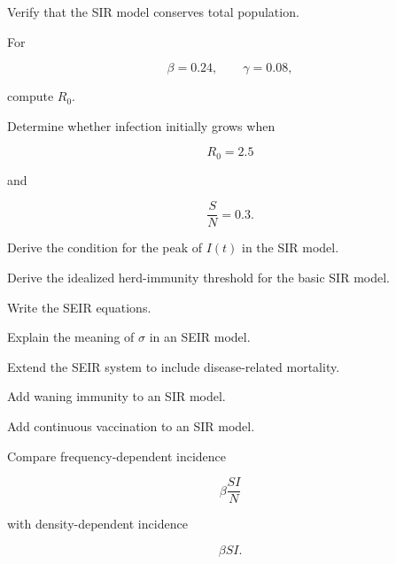 \begin{exercise}[2]
Verify that the SIR model conserves total population.
\end{exercise}

\begin{exercise}[2]
For

\[
\beta=0.24,
\qquad
\gamma=0.08,
\]

compute \(R_0\).
\end{exercise}

\begin{exercise}[3]
Determine whether infection initially grows when

\[
R_0=2.5
\]

and

\[
\frac{S}{N}=0.3.
\]
\end{exercise}

\begin{exercise}[3]
Derive the condition for the peak of \(I(t)\) in the SIR model.
\end{exercise}

\begin{exercise}[3]
Derive the idealized herd-immunity threshold for the basic SIR model.
\end{exercise}

\begin{exercise}[2]
Write the SEIR equations.
\end{exercise}

\begin{exercise}[2]
Explain the meaning of \(\sigma\) in an SEIR model.
\end{exercise}

\begin{exercise}[3]
Extend the SEIR system to include disease-related mortality.
\end{exercise}

\begin{exercise}[3]
Add waning immunity to an SIR model.
\end{exercise}

\begin{exercise}[3]
Add continuous vaccination to an SIR model.
\end{exercise}

\begin{exercise}[3]
Compare frequency-dependent incidence

\[
\beta\frac{SI}{N}
\]

with density-dependent incidence

\[
\beta SI.
\]
\end{exercise}

